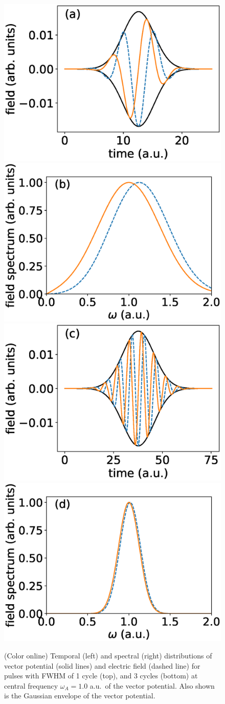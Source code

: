 \begin{figure}[t]
\centering
   
    \includegraphics[width=0.49\linewidth]{figs/Frequency_shift/01_field.eps}
    \includegraphics[width=0.49\linewidth]{figs/Frequency_shift/01_spec.eps}
    \includegraphics[width=0.49\linewidth]{figs/Frequency_shift/03_field.eps}
    \includegraphics[width=0.49\linewidth]{figs/Frequency_shift/03_spec.eps}
   
\caption{(Color online)
Temporal (left) and spectral (right) distributions of vector potential (solid lines) and electric field (dashed line) for pulses with FWHM of 1 cycle (top), and 3 cycles (bottom) at central frequency $\omega_A = 1.0$ a.u.\  of the vector potential. Also shown is the Gaussian envelope of the vector potential. 
} 
  \label{fig:spectra}
\end{figure}


